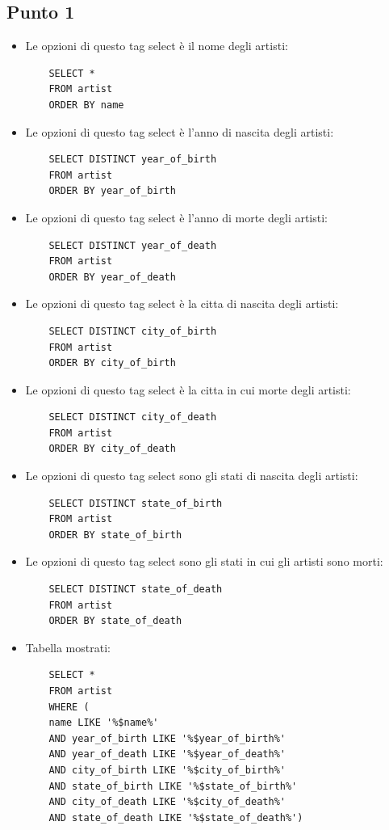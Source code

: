 \documentclass{ol-softwaremanual}
\begin{document}
\subsection{Punto 1}
\begin{itemize}
    \item Le opzioni di questo tag select è il nome degli artisti:
    \begin{verbatim}
    SELECT *
    FROM artist
    ORDER BY name
    \end{verbatim}
    \item Le opzioni di questo tag select è l'anno di nascita degli artisti:
    \begin{verbatim}
    SELECT DISTINCT year_of_birth
    FROM artist
    ORDER BY year_of_birth
    \end{verbatim}
    \item Le opzioni di questo tag select è l'anno di morte degli artisti:
    \begin{verbatim}
    SELECT DISTINCT year_of_death
    FROM artist
    ORDER BY year_of_death
    \end{verbatim}
    \item Le opzioni di questo tag select è la citta di nascita degli artisti:
    \begin{verbatim}
    SELECT DISTINCT city_of_birth
    FROM artist
    ORDER BY city_of_birth
    \end{verbatim}
    \item Le opzioni di questo tag select è la citta in cui morte degli artisti:
    \begin{verbatim}
    SELECT DISTINCT city_of_death
    FROM artist
    ORDER BY city_of_death
    \end{verbatim}
    \item Le opzioni di questo tag select sono gli stati di nascita degli artisti:
    \begin{verbatim}
    SELECT DISTINCT state_of_birth
    FROM artist
    ORDER BY state_of_birth
    \end{verbatim}
    \item Le opzioni di questo tag select sono gli stati in cui gli artisti sono morti:
    \begin{verbatim}
    SELECT DISTINCT state_of_death
    FROM artist
    ORDER BY state_of_death
    \end{verbatim}
    \item Tabella mostrati:
    \begin{verbatim}
    SELECT *
    FROM artist
    WHERE (
    name LIKE '%$name%' 
    AND year_of_birth LIKE '%$year_of_birth%'
    AND year_of_death LIKE '%$year_of_death%'
    AND city_of_birth LIKE '%$city_of_birth%' 
    AND state_of_birth LIKE '%$state_of_birth%' 
    AND city_of_death LIKE '%$city_of_death%' 
    AND state_of_death LIKE '%$state_of_death%')
    \end{verbatim}
\end{itemize}
\end{document}
